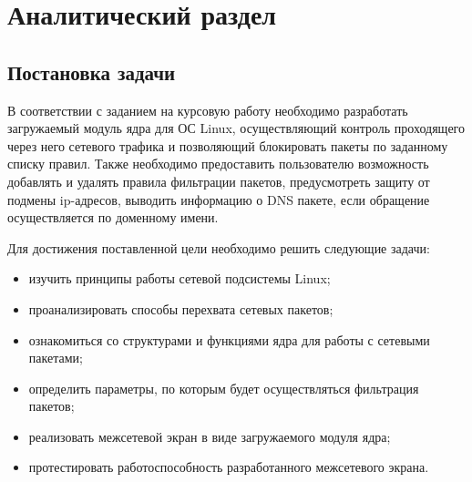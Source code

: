 \chapter{Аналитический раздел}

\section{Постановка задачи}

В соответствии с заданием на курсовую работу необходимо разработать загружаемый модуль ядра для ОС Linux, осуществляющий контроль  проходящего через него сетевого трафика и позволяющий блокировать пакеты по заданному списку правил. Также необходимо предоставить пользователю возможность добавлять и удалять правила фильтрации пакетов, предусмотреть защиту от подмены ip-адресов, выводить информацию о DNS пакете, если обращение осуществляется по доменному имени.

Для достижения поставленной цели необходимо решить следующие задачи:
\begin{itemize}
	\item изучить принципы работы сетевой подсистемы Linux;
	
	\item проанализировать способы перехвата сетевых пакетов;
	
	\item ознакомиться со структурами и функциями ядра для работы с сетевыми пакетами;
	
	\item определить параметры, по которым будет осуществляться  фильтрация пакетов;
	
	\item реализовать межсетевой экран в виде загружаемого модуля ядра;
	
	\item протестировать работоспособность разработанного межсетевого экрана.
\end{itemize}






